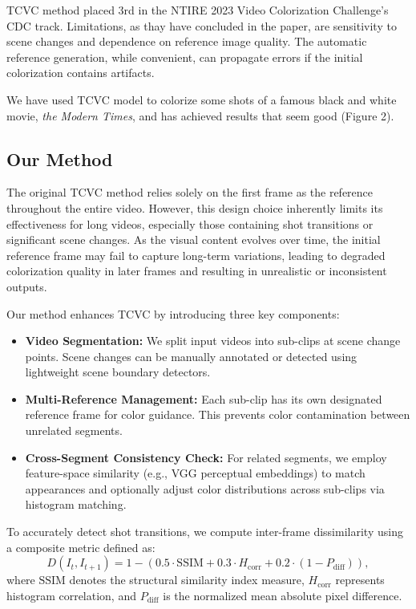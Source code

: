 \documentclass[10pt,twocolumn,letterpaper]{article}
\begin{document}
TCVC method placed 3rd in the NTIRE 2023 Video Colorization Challenge's CDC track. Limitations, as thay have concluded in the paper, are sensitivity to scene changes and dependence on reference image quality. The automatic reference generation, while convenient, can propagate errors if the initial colorization contains artifacts.

We have used TCVC model to colorize some shots of a famous black and white movie, \textit{the Modern Times}, and has achieved results that seem good (Figure 2).


\subsection{Our Method}
The original TCVC method relies solely on the first frame as the reference throughout the entire video. However, this design choice inherently limits its effectiveness for long videos, especially those containing shot transitions or significant scene changes. As the visual content evolves over time, the initial reference frame may fail to capture long-term variations, leading to degraded colorization quality in later frames and resulting in unrealistic or inconsistent outputs.

Our method enhances TCVC by introducing three key components:
\begin{itemize}
    \item \textbf{Video Segmentation:} We split input videos into sub-clips at scene change points. Scene changes can be manually annotated or detected using lightweight scene boundary detectors.
    \item \textbf{Multi-Reference Management:} Each sub-clip has its own designated reference frame for color guidance. This prevents color contamination between unrelated segments.
    \item \textbf{Cross-Segment Consistency Check:} For related segments, we employ feature-space similarity (e.g., VGG perceptual embeddings) to match appearances and optionally adjust color distributions across sub-clips via histogram matching.
\end{itemize}

To accurately detect shot transitions, we compute inter-frame dissimilarity using a composite metric defined as: \begin{equation} D(I_t, I_{t+1}) = 1 - (0.5 \cdot \text{SSIM} + 0.3 \cdot H_{\text{corr}} + 0.2 \cdot (1 - P_{\text{diff}})), \end{equation} where $\text{SSIM}$ denotes the structural similarity index measure, $H_{\text{corr}}$ represents histogram correlation, and $P_{\text{diff}}$ is the normalized mean absolute pixel difference.
\end{document}
